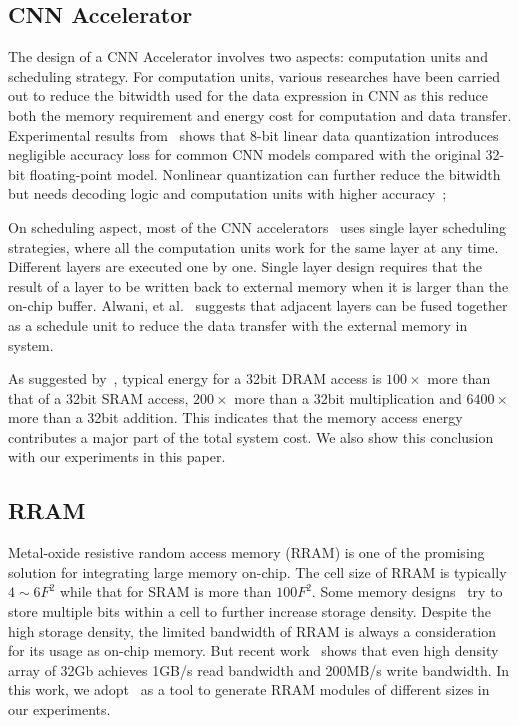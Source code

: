 \subsection{CNN Accelerator}
The design of a CNN Accelerator involves two aspects: computation units and scheduling strategy. For computation units, various researches have been carried out to reduce the bitwidth used for the data expression in CNN as this reduce both the memory requirement and energy cost for computation and data transfer. Experimental results from~\cite{guo2017software} shows that 8-bit linear data quantization introduces negligible accuracy loss for common CNN models compared with the original 32-bit floating-point model. Nonlinear quantization can further reduce the bitwidth~\cite{han2015deep} but needs decoding logic and computation units with higher accuracy~\cite{eie};

On scheduling aspect, most of the CNN accelerators~\cite{zhang2015optimizing}\cite{qiu2016going}\cite{ma2017optimizing} uses single layer scheduling strategies, where all the computation units work for the same layer at any time. Different layers are executed one by one. Single layer design requires that the result of a layer to be written back to external memory when it is larger than the on-chip buffer. Alwani, et al.~\cite{alwani2016fused} suggests that adjacent layers can be fused together as a schedule unit to reduce the data transfer with the external memory in system.

As suggested by~\cite{mac_energy}, typical energy for a 32bit DRAM access is $100\times$ more than that of a 32bit SRAM access, $200\times$ more than a 32bit multiplication and $6400\times$ more than a 32bit addition. This indicates that the memory access energy contributes a major part of the total system cost. We also show this conclusion with our experiments in this paper.

\subsection{RRAM}
Metal-oxide resistive random access memory (RRAM) is one of the promising solution for integrating large memory on-chip. The cell size of RRAM is typically $4\sim 6F^2$ while that for SRAM is more than $100F^2$. Some memory designs~\cite{chien2009multi}\cite{chien2011multi} try to store multiple bits within a cell to further increase storage density. Despite the high storage density, the limited bandwidth of RRAM is always a consideration for its usage as on-chip memory. But recent work~\cite{fackenthal201419} shows that even high density array of 32Gb achieves 1GB/s read bandwidth and 200MB/s write bandwidth. In this work, we adopt~\cite{dong2014nvsim} as a tool to generate RRAM modules of different sizes in our experiments.